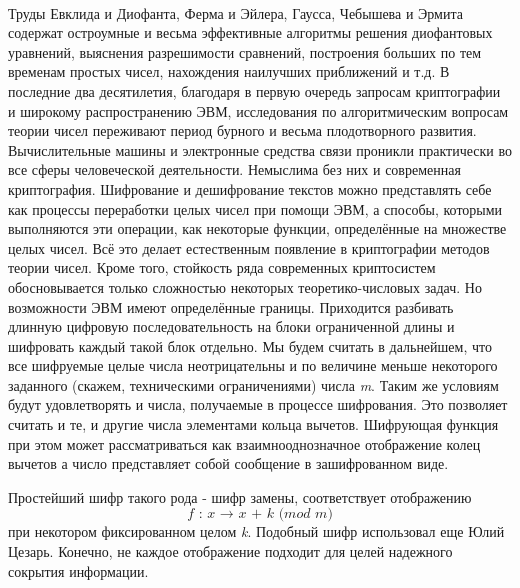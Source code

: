 \paragraph{} Труды Евклида и Диофанта, Ферма и Эйлера, Гаусса, Чебышева и Эрмита содержат остроумные и весьма эффективные алгоритмы решения диофантовых 
уравнений, выяснения разрешимости сравнений, построения больших по тем временам простых чисел, нахождения наилучших приближений и т.д. В последние два 
десятилетия, благодаря в первую очередь запросам криптографии и широкому распространению ЭВМ, исследования по алгоритмическим вопросам теории чисел 
переживают период бурного и весьма плодотворного развития. Вычислительные машины и электронные средства связи проникли практически во все сферы 
человеческой деятельности. Немыслима без них и современная криптография. Шифрование и дешифрование текстов можно представлять себе как процессы 
переработки целых чисел при помощи ЭВМ, а способы, которыми выполняются эти операции, как некоторые функции, определённые на множестве целых чисел. 
Всё это делает естественным появление в криптографии методов теории чисел. Кроме того, стойкость ряда современных криптосистем обосновывается только 
сложностью некоторых теоретико-числовых задач. Но возможности ЭВМ имеют определённые границы. Приходится разбивать длинную цифровую последовательность 
на блоки ограниченной длины и шифровать каждый такой блок отдельно. Мы будем считать в дальнейшем, что все шифруемые целые числа неотрицательны и по 
величине меньше некоторого заданного (скажем, техническими ограничениями) числа \textit{m}. Таким же условиям будут удовлетворять и числа, получаемые 
в процессе шифрования. Это позволяет считать и те, и другие числа элементами кольца вычетов. Шифрующая функция при этом может рассматриваться как 
взаимнооднозначное отображение колец вычетов а число  представляет собой сообщение  в зашифрованном виде.

  Простейший шифр такого рода - шифр замены, соответствует отображению
\begin{equation}
    \textit{f : x {$\rightarrow$} x + k (mod m)}
\end{equation}
при некотором фиксированном целом \textit{k}. Подобный шифр использовал еще Юлий Цезарь. Конечно, не каждое отображение  подходит для целей надежного 
сокрытия информации.

